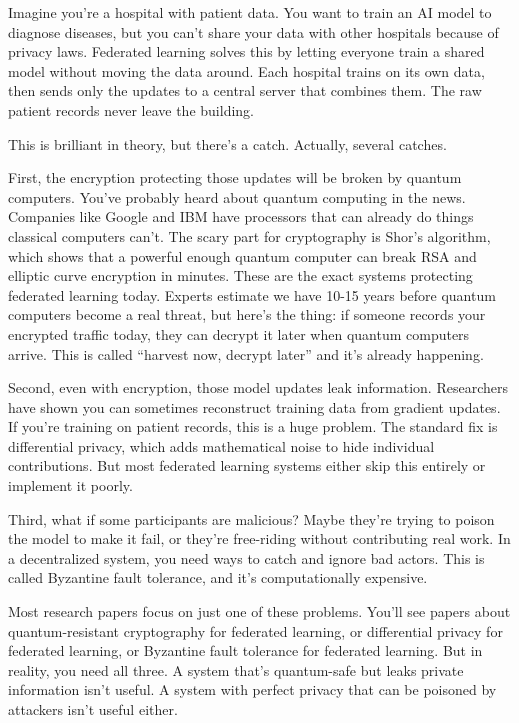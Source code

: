 \documentclass[journal,onecolumn]{IEEEtran}
\begin{document}
Imagine you're a hospital with patient data. You want to train an AI model to diagnose diseases, but you can't share your data with other hospitals because of privacy laws. Federated learning solves this by letting everyone train a shared model without moving the data around. Each hospital trains on its own data, then sends only the updates to a central server that combines them. The raw patient records never leave the building.

This is brilliant in theory, but there's a catch. Actually, several catches.

First, the encryption protecting those updates will be broken by quantum computers. You've probably heard about quantum computing in the news. Companies like Google and IBM have processors that can already do things classical computers can't. The scary part for cryptography is Shor's algorithm, which shows that a powerful enough quantum computer can break RSA and elliptic curve encryption in minutes. These are the exact systems protecting federated learning today. Experts estimate we have 10-15 years before quantum computers become a real threat, but here's the thing: if someone records your encrypted traffic today, they can decrypt it later when quantum computers arrive. This is called ``harvest now, decrypt later'' and it's already happening.

Second, even with encryption, those model updates leak information. Researchers have shown you can sometimes reconstruct training data from gradient updates. If you're training on patient records, this is a huge problem. The standard fix is differential privacy, which adds mathematical noise to hide individual contributions. But most federated learning systems either skip this entirely or implement it poorly.

Third, what if some participants are malicious? Maybe they're trying to poison the model to make it fail, or they're free-riding without contributing real work. In a decentralized system, you need ways to catch and ignore bad actors. This is called Byzantine fault tolerance, and it's computationally expensive.

Most research papers focus on just one of these problems. You'll see papers about quantum-resistant cryptography for federated learning, or differential privacy for federated learning, or Byzantine fault tolerance for federated learning. But in reality, you need all three. A system that's quantum-safe but leaks private information isn't useful. A system with perfect privacy that can be poisoned by attackers isn't useful either.
\end{document}
